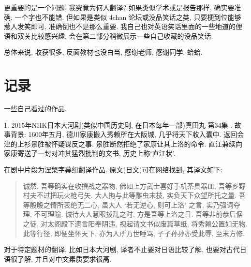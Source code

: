 \documentclass[a4paper, 12pt, UTF8]{article}
\begin{document}
更重要的是一个问题, 我究竟为何人翻译? 如果类似学术或是报告那样, 确实要准确, 一个字也不能错. 但如果是类似 4chan 论坛或没品笑话之类, 只要梗到位能够惹人发笑即可, 准确倒也不是那么重要. 我自己也对英语笑话里面的一些地道的俚语和双关比较感兴趣, 会在第二部分稍微展示一些自己收藏的没品笑话.

总体来说, 收获很多, 反面教材也没白当, 感谢老师, 感谢同学, 蛤蛤.

\section{记录}
一些自己看过的作品.

1. 2015年NHK日本大河剧(类似中国历史剧, 在日本每年一部)真田丸 第34集
. 故事背景: 1600年五月, 德川家康搬入秀赖所在大阪城, 几乎将天下收入囊中. 返回会津的上衫景胜被怀疑谋反之事. 景胜断然拒绝了家康让其上洛的命令. 直江兼续向家康寄送了一封对冲其猛烈批判的文书, 历史上称`直江状'. 

在剧中片段为涅槃字幕组翻译作品. 原文(日文)可在网络找到, 其译文如下: 

\begin{quote}
    诚然, 吾等确实在收撰战之器物, 佛如上方武士喜好手机茶具器皿, 吾等乡野村夫不过把玩火枪弓矢. 大人拘与此等雕虫末技, 实负天下众望所托之量. 吾等殷殷之情所表绝无二心, 虽大人 `若无逆心, 则可上洛' 之言, 实乃强词夺理, 不可理喻. 诚待大人慧眼拨乱之时, 方是吾等上洛之日. 吾等非前恭后倨之徒, 对太阁殿下遗言阳奉阴违, 视起请文书似废篇草纸, 将秀赖公置如无物. 此等行径, 即便坐怀天下, 亦为人所万世唾骂, 子子孙孙亦受此辱, 至末方修.
\end{quote}

对于特定题材的翻译, 比如日本大河剧, 译者不止要对日语比较了解, 也要对古代日语很了解, 并且对中文素质要求很高.
\end{document}
